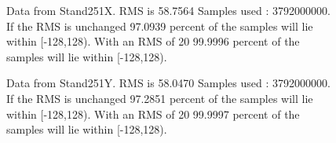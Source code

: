 \begin{figure}[ht] 				 				 				\caption{Data from Stand251X. RMS is 58.7564 Samples used : 3792000000. If the RMS is unchanged 97.0939 percent of the samples will lie within [-128,128).  				 With an RMS of 20 99.9996 percent of the samples will lie within [-128,128).} 				\end{figure} 

\begin{figure}[ht] 				 				 				\caption{Data from Stand251Y. RMS is 58.0470 Samples used : 3792000000. If the RMS is unchanged 97.2851 percent of the samples will lie within [-128,128).  				 With an RMS of 20 99.9997 percent of the samples will lie within [-128,128).} 				\end{figure} 

